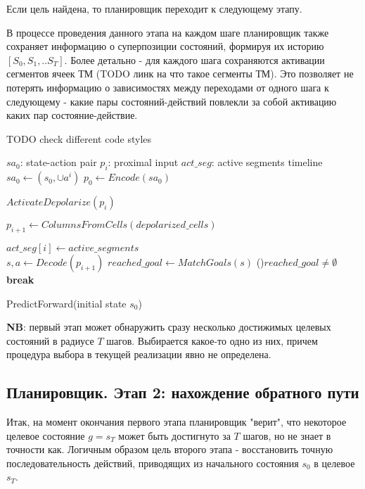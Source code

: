 \documentclass[a4paper]{article}
\begin{document}
Если цель найдена, то планировщик переходит к следующему этапу.

В процессе проведения данного этапа на каждом шаге планировщик также сохраняет информацию о суперпозиции состояний, формируя их историю $[S_0, S_1, .. S_T]$. Более детально - для каждого шага сохраняются активации сегментов ячеек ТМ (TODO линк на что такое сегменты ТМ). Это позволяет не потерять информацию о зависимостях между переходами от одного шага к следующему - какие пары состояний-действий повлекли за собой активацию каких пар состояние-действие.

TODO check different code styles
\begin{function}
  $sa_0$: state-action pair \;
  $p_i$: proximal input \;
  $act\_seg$: active segments timeline \;
  \quad \\

  $sa_0 \leftarrow (s_0, \cup a^i)$ \;
  $p_0 \leftarrow Encode(sa_0)$ \;

   {
    $ActivateDepolarize(p_i)$ 
    
    $p_{i+1} \leftarrow ColumnsFromCells(depolarized\_cells)$ 
    
    $act\_seg[i] \leftarrow active\_segments$ 
    \quad \\
    
    $s, a \leftarrow Decode(p_{i+1})$ \;
    $reached\_goal \leftarrow MatchGoals(s)$ \;
    \If(){$reached\_goal \neq \emptyset$} {
      \textbf{break}
    }{}
  }
  
   \;

  \caption{PredictForward(initial state $s_0$)}
\end{function}

\textbf{NB}: первый этап может обнаружить сразу несколько достижимых целевых состояний в радиусе $T$ шагов. Выбирается какое-то одно из них, причем процедура выбора в текущей реализации явно не определена.

\subsection{Планировщик. Этап 2: нахождение обратного пути}

Итак, на момент окончания первого этапа планировщик "верит", что некоторое целевое состояние $g = s_T$ может быть достигнуто за $T$ шагов, но не знает в точности как. Логичным образом цель второго этапа - восстановить 
точную последовательность действий, приводящих из начального состояния $s_0$ в целевое $s_T$.
\end{document}
